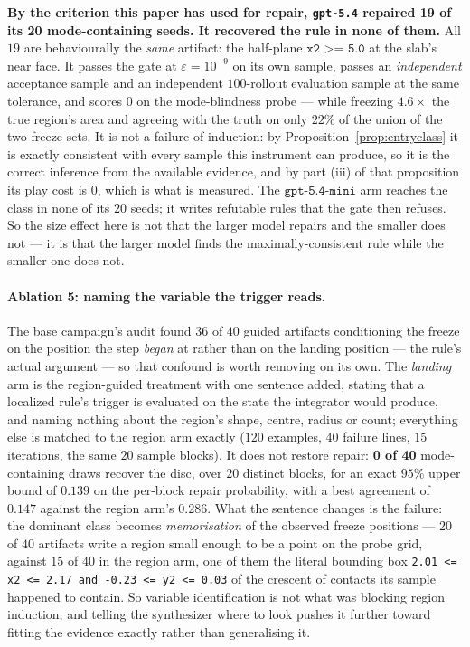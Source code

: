 \documentclass[11pt]{article}
\theoremstyle{definition}
\theoremstyle{remark}
\begin{document}
\textbf{By the criterion this paper has used for repair, \texttt{gpt-5.4} repaired 19 of its 20 mode-containing seeds. It recovered the rule in none of them.} All $19$ are behaviourally the \emph{same} artifact: the half-plane $\texttt{x2 >= 5.0}$ at the slab's near face. It passes the gate at $\varepsilon = 10^{-9}$ on its own sample, passes an \emph{independent} acceptance sample and an independent $100$-rollout evaluation sample at the same tolerance, and scores $0$ on the mode-blindness probe --- while freezing $4.6\times$ the true region's area and agreeing with the truth on only $22\%$ of the union of the two freeze sets. It is not a failure of induction: by Proposition~\ref{prop:entryclass} it is exactly consistent with every sample this instrument can produce, so it is the correct inference from the available evidence, and by part (iii) of that proposition its play cost is $0$, which is what is measured. The $\texttt{gpt-5.4-mini}$ arm reaches the class in none of its $20$ seeds; it writes refutable rules that the gate then refuses. So the size effect here is not that the larger model repairs and the smaller does not --- it is that the larger model finds the maximally-consistent rule while the smaller one does not.

\paragraph{Ablation 5: naming the variable the trigger reads.} The base campaign's audit found $36$ of $40$ guided artifacts conditioning the freeze on the position the step \emph{began} at rather than on the landing position --- the rule's actual argument --- so that confound is worth removing on its own. The \emph{landing} arm is the region-guided treatment with one sentence added, stating that a localized rule's trigger is evaluated on the state the integrator would produce, and naming nothing about the region's shape, centre, radius or count; everything else is matched to the region arm exactly ($120$ examples, $40$ failure lines, $15$ iterations, the same $20$ sample blocks). It does not restore repair: \textbf{0 of 40} mode-containing draws recover the disc, over $20$ distinct blocks, for an exact $95\%$ upper bound of $0.139$ on the per-block repair probability, with a best agreement of $0.147$ against the region arm's $0.286$. What the sentence changes is the failure: the dominant class becomes \emph{memorisation} of the observed freeze positions --- $20$ of $40$ artifacts write a region small enough to be a point on the probe grid, against $15$ of $40$ in the region arm, one of them the literal bounding box \texttt{2.01 <= x2 <= 2.17 and -0.23 <= y2 <= 0.03} of the crescent of contacts its sample happened to contain. So variable identification is not what was blocking region induction, and telling the synthesizer where to look pushes it further toward fitting the evidence exactly rather than generalising it.
\end{document}
